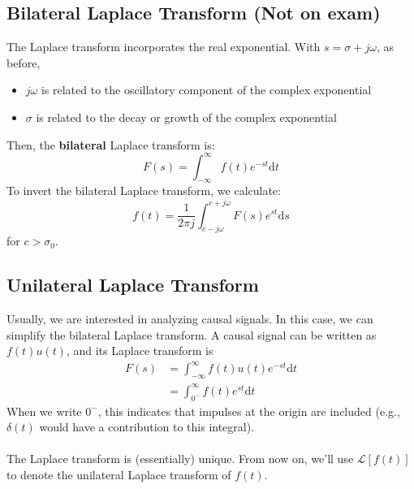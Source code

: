 \documentclass[10pt]{article}
\newcommand{\laplace}{\mathcal{L}}
\newcommand{\absint}{\int_{-\infty}^\infty}
\newcommand{\dd}{\text{d}}
\begin{document}
\subsection*{Bilateral Laplace Transform (Not on exam)}
The Laplace transform incorporates the real exponential.  With $s = \sigma + j\omega$, as before, 
\begin{itemize}
    \item $j\omega$ is related to the oscillatory component of the complex exponential
    \item $\sigma$ is related to the decay or growth of the complex exponential
\end{itemize}
Then, the \textbf{bilateral} Laplace transform is:
\[\boxed{F(s) = \absint f(t) e^{-st} \dd t}\]
To invert the bilateral Laplace transform, we calculate:
\[\boxed{f(t) = \frac{1}{2\pi j} \int_{c - j\omega}^{c + j\omega} F(s) e^{st} \dd s}\]
for $c > \sigma_0$.

\subsection*{Unilateral Laplace Transform}
Usually, we are interested in analyzing causal signals.  In this case, we can simplify the bilateral Laplace transform.  A causal signal can be written as $f(t)u(t)$, and its Laplace transform is
\begin{align*}
    F(s) &= \absint f(t)u(t) e^{-st} \dd t\\
    &= \int_{0^-}^\infty f(t) e^{st} \dd t
\end{align*}
When we write $0^-$, this indicates that impulses at the origin are included (e.g., $\delta(t)$ would have a contribution to this integral).\\\\
The Laplace transform is (essentially) unique.  From now on, we'll use $\laplace[f(t)]$ to denote the unilateral Laplace transform of $f(t)$.
\end{document}

